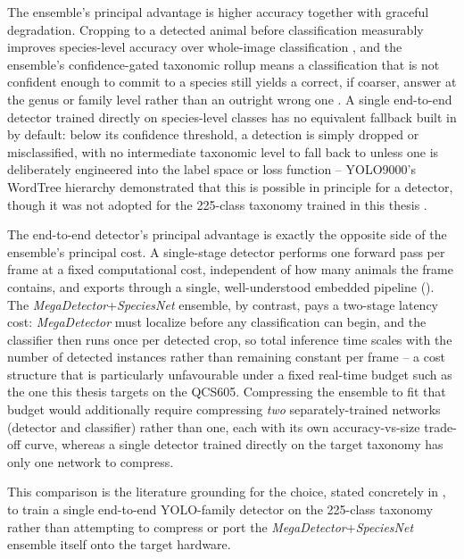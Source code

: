 The ensemble's principal advantage is higher accuracy together with graceful degradation. Cropping to a detected animal before classification measurably improves species-level accuracy over whole-image classification \cite{gadotCropNotCrop2024}, and the ensemble's confidence-gated taxonomic rollup means a classification that is not confident enough to commit to a species still yields a correct, if coarser, answer at the genus or family level rather than an outright wrong one \cite{gadotCropNotCrop2024}. A single end-to-end detector trained directly on species-level classes has no equivalent fallback built in by default: below its confidence threshold, a detection is simply dropped or misclassified, with no intermediate taxonomic level to fall back to unless one is deliberately engineered into the label space or loss function -- YOLO9000's WordTree hierarchy demonstrated that this is possible in principle for a detector, though it was not adopted for the 225-class taxonomy trained in this thesis \cite{redmonYOLO9000BetterFaster2017}.

The end-to-end detector's principal advantage is exactly the opposite side of the ensemble's principal cost. A single-stage detector performs one forward pass per frame at a fixed computational cost, independent of how many animals the frame contains, and exports through a single, well-understood embedded pipeline (). The \textit{MegaDetector}+\textit{SpeciesNet} ensemble, by contrast, pays a two-stage latency cost: \textit{MegaDetector} must localize before any classification can begin, and the classifier then runs once per detected crop, so total inference time scales with the number of detected instances rather than remaining constant per frame -- a cost structure that is particularly unfavourable under a fixed real-time budget such as the one this thesis targets on the QCS605. Compressing the ensemble to fit that budget would additionally require compressing \emph{two} separately-trained networks (detector and classifier) rather than one, each with its own accuracy-vs-size trade-off curve, whereas a single detector trained directly on the target taxonomy has only one network to compress.

This comparison is the literature grounding for the choice, stated concretely in , to train a single end-to-end YOLO-family detector on the 225-class taxonomy rather than attempting to compress or port the \textit{MegaDetector}+\textit{SpeciesNet} ensemble itself onto the target hardware.

